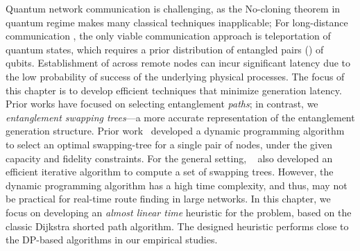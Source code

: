 Quantum network communication is 
challenging, as the No-cloning theorem in quantum regime
makes many classical techniques inapplicable; 
For long-distance communication , 
the only viable communication approach  is 
teleportation of quantum states, which requires a prior distribution of 
entangled pairs (\epss) of qubits.
Establishment of \epss across remote nodes can incur significant 
latency due to the low probability of success of the underlying 
physical processes. 
The focus of this chapter is to develop
efficient techniques that minimize \eps generation latency. Prior works
have focused on selecting entanglement \textit{paths}; in contrast, we   \emph{entanglement swapping trees}---a more accurate 
representation of the entanglement generation structure. 
Prior work~\cite{tqe22-quantum} developed a dynamic programming algorithm 
to select an optimal swapping-tree for a single pair of nodes, under the given capacity
and fidelity constraints. For the general setting, ~\cite{tqe22-quantum} also developed an 
efficient iterative algorithm to compute a set of swapping trees.
However, the dynamic programming algorithm has a high time complexity, and thus, may not
be practical for real-time route finding in large networks.
In this chapter, we focus on developing an \emph{almost linear time} heuristic for the \spp problem,
based on the classic Dijkstra shorted path algorithm.
The designed heuristic performs close to the DP-based algorithms in our empirical studies.